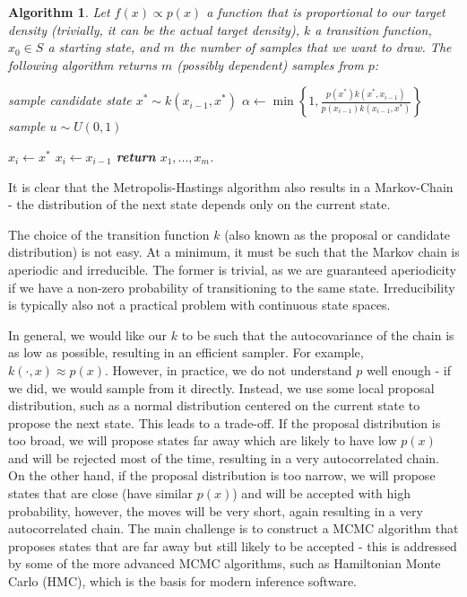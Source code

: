 \documentclass{book}
\theoremstyle{plain}%
\newtheorem{algo}{Algorithm}[section]
\theoremstyle{definition}
\newlength{\arrow}
\begin{document}
\begin{algo}
Let $f(x) \propto p(x)$ a function that is proportional to our target density (trivially, it can be the actual target density), $k$ a transition function, $x_0 \in S$ a starting state, and $m$ the number of samples that we want to draw. The following algorithm returns $m$ (possibly dependent) samples from $p$:
\begin{algorithmic}[1]
 
\State sample candidate state $x^* \sim k(x_{i-1}, x^*)$
\State $\alpha \gets \min \left\lbrace 1, \frac{p(x^*)k(x^*,x_{i-1})}{p(x_{i-1})k(x_{i-1},x^*)}\right\rbrace$
\State sample $u \sim U(0,1)$

\State $x_i \gets x^*$ 
\Else
\State $x_i \gets x_{i-1}$ 
\EndIf
              \EndFor
              \State \textbf{return} $x_1,...,x_m$.
        \EndProcedure
    \end{algorithmic}\label{alg:bootstrap}
\end{algo}

It is clear that the Metropolis-Hastings algorithm also results in a Markov-Chain - the distribution of the next state depends only on the current state.

The choice of the transition function $k$ (also known as the proposal or candidate distribution) is not easy. At a minimum, it must be such that the Markov chain is aperiodic and irreducible. The former is trivial, as we are guaranteed aperiodicity if we have a non-zero probability of transitioning to the same state. Irreducibility is typically also not a practical problem with continuous state spaces.

In general, we would like our $k$ to be such that the autocovariance of the chain is as low as possible, resulting in an efficient sampler. For example, $k(\cdot, x) \approx p(x)$. However, in practice, we do not understand $p$ well enough - if we did, we would sample from it directly. Instead, we use some local proposal distribution, such as a normal distribution centered on the current state to propose the next state. This leads to a trade-off. If the proposal distribution is too broad, we will propose states far away which are likely to have low $p(x)$ and will be rejected most of the time, resulting in a very autocorrelated chain. On the other hand, if the proposal distribution is too narrow, we will propose states that are close (have similar $p(x)$) and will be accepted with high probability, however, the moves will be very short, again resulting in a very autocorrelated chain. The main challenge is to construct a MCMC algorithm that proposes states that are far away but still likely to be accepted - this is addressed by some of the more advanced MCMC algorithms, such as Hamiltonian Monte Carlo (HMC), which is the basis for modern inference software.
\end{document}
